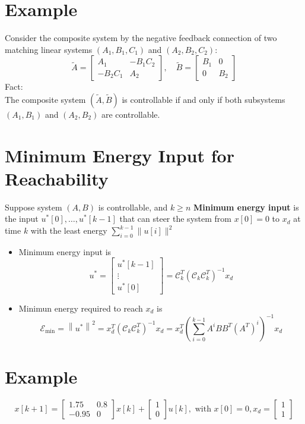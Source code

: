 \documentclass[10pt,a4paper,oneside]{article}
\begin{document}
\section{Example}
Consider the composite system by the negative feedback connection of two matching linear systems $\left(A_{1}, B_{1}, C_{1}\right)$ and $\left(A_{2}, B_{2}, C_{2}\right)$:
\[
\tilde{A}=\left[\begin{array}{cc}{A_{1}} & {-B_{1} C_{2}} \\ {-B_{2} C_{1}} & {A_{2}}\end{array}\right], \quad \tilde{B}=\left[\begin{array}{cc}{B_{1}} & {0} \\ {0} & {B_{2}}\end{array}\right]
\]
Fact:\\
The composite system $(\tilde{A}, \tilde{B})$ is controllable if and only if both subsystems $\left(A_{1}, B_{1}\right)$ and $\left(A_{2}, B_{2}\right)$ are controllable.
\section{Minimum Energy Input for Reachability}
Suppose system $(A,B)$ is controllable, and $k\geq n$
{\bfseries Minimum energy input} is the input $u^{*}[0], \ldots, u^{*}[k-1]$ that can steer the system from $x[0]=0$ to $x_d$ at time $k$ with the least energy $\sum_{i=0}^{k-1}\|u[i]\|^{2}$
\begin{itemize}
\item Minimum energy input is
\[
u^{*}=\left[\begin{array}{c}{u^{*}[k-1]} \\ {\vdots} \\ {u^{*}[0]}\end{array}\right]=\mathcal{C}_{k}^{T}\left(\mathcal{C}_{k} \mathcal{C}_{k}^{T}\right)^{-1} x_{d}
\]
\item Minimun energy required to reach $x_d$ is
\[
\mathcal{E}_{\min }=\left\|u^{*}\right\|^{2}=x_{d}^{T}\left(\mathcal{C}_{k} \mathcal{C}_{k}^{T}\right)^{-1} x_{d}=x_{d}^{T}\left(\sum_{i=0}^{k-1} A^{i} B B^{T}\left(A^{T}\right)^{i}\right)^{-1} x_{d}
\]
\end{itemize}
\section{Example}
\[
x[k+1]=\left[\begin{array}{cc}{1.75} & {0.8} \\ {-0.95} & {0}\end{array}\right] x[k]+\left[\begin{array}{l}{1} \\ {0}\end{array}\right] u[k], \text { with } x[0]=0, x_{d}=\left[\begin{array}{l}{1} \\ {1}\end{array}\right]
\]
\end{document}

